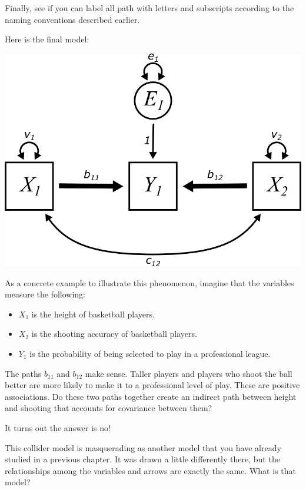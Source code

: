 \documentclass[
]{book}
\providecommand{\tightlist}{%
  \setlength{\itemsep}{0pt}\setlength{\parskip}{0pt}}
\begin{document}
Finally, see if you can label all path with letters and subscripts according to the naming conventions described earlier.

Here is the final model:

\begin{center}\includegraphics{graphics/collider_vars} \end{center}

As a concrete example to illustrate this phenomenon, imagine that the variables measure the following:

\begin{itemize}
\tightlist
\item
  \(X_{1}\) is the height of basketball players.
\item
  \(X_{2}\) is the shooting accuracy of basketball players.
\item
  \(Y_{1}\) is the probability of being selected to play in a professional league.
\end{itemize}

The paths \(b_{11}\) and \(b_{12}\) make sense. Taller players and players who shoot the ball better are more likely to make it to a professional level of play. These are positive associations. Do these two paths together create an indirect path between height and shooting that accounts for covariance between them?

It turns out the answer is no!

This collider model is masquerading as another model that you have already studied in a previous chapter. It was drawn a little differently there, but the relationships among the variables and arrows are exactly the same. What is that model?
\end{document}

